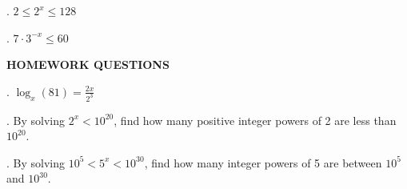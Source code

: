 \documentclass[12pt]{article}
\begin{document}
\vspace{5mm}. \( 2 \leq 2^x \leq 128 \)\vspace{5mm}
\vspace{10mm} %
\noindent \makebox[\linewidth]{\dotfill} %
\vspace{10mm}
\noindent \makebox[\linewidth]{\dotfill}
\vspace{10mm}
\noindent \makebox[\linewidth]{\dotfill}

\vspace{5mm}. \( 7 \cdot 3^{-x} \leq 60 \)\vspace{5mm}
\vspace{10mm} %
\noindent \makebox[\linewidth]{\dotfill} %
\vspace{10mm}
\noindent \makebox[\linewidth]{\dotfill}
\vspace{10mm}
\noindent \makebox[\linewidth]{\dotfill}

\newpage %

\noindent \textbf{HOMEWORK QUESTIONS}

\vspace{5mm}. \( \log_x(81) = \frac{2x}{2^3} \)\vspace{5mm}
\vspace{10mm} %
\noindent \makebox[\linewidth]{\dotfill} %
\vspace{10mm}
\noindent \makebox[\linewidth]{\dotfill}
\vspace{10mm}
\noindent \makebox[\linewidth]{\dotfill}

. By solving \( 2^x < 10^{20} \), find how many positive integer powers of 2 are less than \( 10^{20} \).\vspace{5mm}
\vspace{10mm} %
\noindent \makebox[\linewidth]{\dotfill} %
\vspace{10mm}
\noindent \makebox[\linewidth]{\dotfill}
\vspace{10mm}
\noindent \makebox[\linewidth]{\dotfill}

\vspace{5mm}. By solving \( 10^5 < 5^x < 10^{30} \), find how many integer powers of 5 are between \( 10^5 \) and \( 10^{30} \).\vspace{5mm}
\vspace{10mm} %
\noindent \makebox[\linewidth]{\dotfill} %
\vspace{10mm}
\noindent \makebox[\linewidth]{\dotfill}
\vspace{10mm}
\noindent \makebox[\linewidth]{\dotfill}
\end{document}
